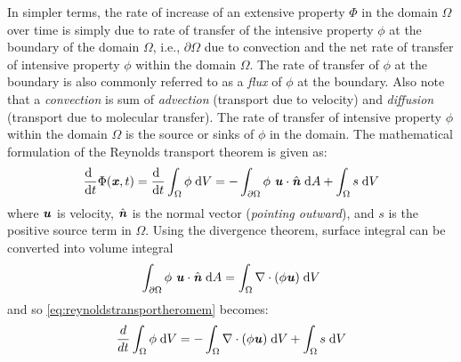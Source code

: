 In simpler terms, the rate of increase of an extensive property $\Phi$ in the domain $\Omega$ over time is simply due to rate of transfer of the intensive property $\phi$ at the boundary of the domain $\Omega$, i.e., $\partial \Omega$ due to convection and the net rate of transfer of intensive property $\phi$ within the domain $\Omega$. The rate of transfer of $\phi$ at the boundary is also commonly referred to as a \textit{flux} of $\phi$ at the boundary. Also note that a \textit{convection} is sum of \textit{advection} (transport due to velocity) and \textit{diffusion} (transport due to molecular transfer). The rate of transfer of intensive property $\phi$ within the domain $\Omega$ is the source or sinks of $\phi$ in the domain. The mathematical formulation of the Reynolds transport theorem is given as:
\begin{equation}
\frac{\mathrm{d}~}{\mathrm{d}t} \Phi (\textbf{\textit{x}},t) = \frac{\mathrm{d}~}{\mathrm{d}t}\int_{\Omega} \phi\;\mathrm{d}V = -\int_{\partial\Omega} \phi~\textbf{\textit{u}}\cdot\hat{\textbf{\textit{n}}}\;\mathrm{d}A + \int_{\Omega} s\;\mathrm{d}V
\label{eq:reynoldstransportheromem}
\end{equation}
where $\textbf{\textit{u}}$ is velocity, $\hat{\textbf{\textit{n}}}$ is the normal vector (\textit{pointing outward}), and $s$ is the positive source term in $\Omega$. Using the divergence theorem,  surface integral can be converted into volume integral
\begin{equation}
\int_{\partial\Omega} \phi~\textbf{\textit{u}}\cdot\hat{\textbf{\textit{n}}}\;\mathrm{d}A = \int_{\Omega} \nabla \cdot (\phi\textbf{\textit{u}})\;\mathrm{d}V
\end{equation}
and so \ref{eq:reynoldstransportheromem} becomes:
\begin{equation}
\frac{d}{dt}\int_{\Omega} \phi\;\mathrm{d}V = -\int_{\Omega} \nabla \cdot (\phi\textbf{\textit{u}})\;\mathrm{d}V + \int_{\Omega} s\;\mathrm{d}V
\end{equation}

